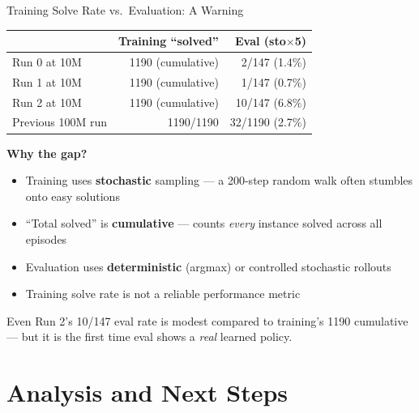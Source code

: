 \documentclass[aspectratio=169,11pt]{beamer}
\begin{document}
\begin{frame}{Training Solve Rate vs.\ Evaluation: A Warning}
  \small
  \begin{center}
  \begin{tabular}{lrr}
    \toprule
    & \textbf{Training ``solved''} & \textbf{Eval (sto$\times$5)} \\
    \midrule
    Run 0 at 10M & 1190 (cumulative) & \textcolor{bad}{2/147 (1.4\%)} \\
    Run 1 at 10M & 1190 (cumulative) & \textcolor{bad}{1/147 (0.7\%)} \\
    Run 2 at 10M & 1190 (cumulative) & \textcolor{good}{10/147 (6.8\%)} \\
    \midrule
    Previous 100M run & 1190/1190 & \textcolor{bad}{32/1190 (2.7\%)} \\
    \bottomrule
  \end{tabular}
  \end{center}

  \bigskip
  \textbf{Why the gap?}
  \begin{itemize}
    \item Training uses \textbf{stochastic} sampling --- a 200-step random walk often stumbles onto easy solutions
    \item ``Total solved'' is \textbf{cumulative} --- counts \emph{every} instance solved across all episodes
    \item Evaluation uses \textbf{deterministic} (argmax) or controlled stochastic rollouts
    \item Training solve rate is \alert{not a reliable performance metric}
  \end{itemize}

  \medskip
  Even Run 2's 10/147 eval rate is modest compared to training's 1190 cumulative ---
  but it is the first time eval shows a \emph{real} learned policy.
\end{frame}

\section{Analysis and Next Steps}
\end{document}
